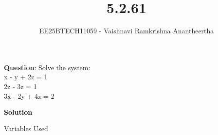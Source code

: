 \documentclass[journal]{IEEEtran}
\title{5.2.61}
\author{EE25BTECH11059 - Vaishnavi Ramkrishna Anantheertha}
\begin{document}
\maketitle

\renewcommand{\thefigure}{\theenumi}
\renewcommand{\thetable}{\theenumi}


\textbf{Question}:
Solve the system:\\
  x - y + 2z = 1 \\
   2z - 3z = 1 \\
  3x - 2y + 4z = 2


\textbf{Solution }
\begin{table}[H]    
  \centering
  
  \caption{Variables Used}
  \label{tab:4.7.56}
\end{table}
\end{document}
